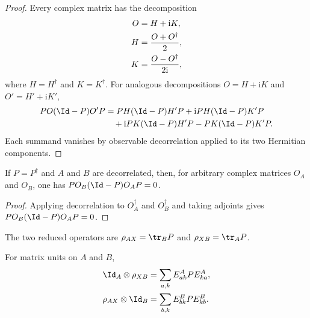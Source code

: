 \begin{proof}
    \leanok
    Every complex matrix has the decomposition
    \begin{align}
        O & =H+\mathrm{i}K,
        \notag                                \\
        H & =\frac{O+O^\dagger}{2},
        \notag                                \\
        K & =\frac{O-O^\dagger}{2\mathrm{i}},
        \notag
    \end{align}
    where $H=H^\dagger$ and $K=K^\dagger$. For analogous decompositions
    $O=H+\mathrm{i}K$ and $O'=H'+\mathrm{i}K'$,
    \begin{align}
        P O(\Id-P)O'P
         & =P H(\Id-P)H'P
        +\mathrm{i}P H(\Id-P)K'P
        \notag                           \\
         & \quad+\mathrm{i}P K(\Id-P)H'P
        -P K(\Id-P)K'P.
        \notag
    \end{align}
    Each summand vanishes by observable decorrelation applied to its two
    Hermitian components.
\end{proof}

\begin{lemma}
    \label{thm:tripartite_decorrelation_reverse}
    \leanok
    If $P=P^\dagger$ and $A$ and $B$ are decorrelated, then, for arbitrary
    complex matrices $O_A$ and $O_B$, one has
    $P O_B(\Id-P)O_A P=0$.
\end{lemma}

\begin{proof}
    \leanok
    Applying decorrelation to $O_A^\dagger$ and $O_B^\dagger$ and taking
    adjoints gives $P O_B(\Id-P)O_A P=0$.
\end{proof}

\begin{definition}
    \label{def:tripartite_marginals}
    \leanok
    The two reduced operators are $\rho_{AX}=\tr_B P$ and
    $\rho_{XB}=\tr_A P$.
\end{definition}

\begin{lemma}
    \label{thm:tripartite_marginal_matrix_units}
    \leanok
    For matrix units on $A$ and $B$,
    \begin{align}
        \Id_A\otimes\rho_{XB}
         & =\sum_{a,k}E^A_{ak}P E^A_{ka},
        \notag                            \\
        \rho_{AX}\otimes\Id_B
         & =\sum_{b,k}E^B_{bk}P E^B_{kb}.
        \notag
    \end{align}
\end{lemma}

